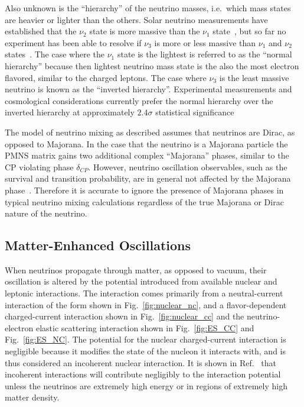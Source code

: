 Also unknown is the ``hierarchy'' of the neutrino masses, i.e.\ which
mass states are heavier or lighter than the others.
Solar neutrino measurements have established that the $\nu_{2}$ state
is more massive than the $\nu_{1}$ state~\citep{sno_first, sno_combined}, but so far no experiment has been
able to resolve if $\nu_{3}$ is more or less massive than $\nu_{1}$ and $\nu_{2}$ states~\citep{vogel_hierarchy}.
The case where the $\nu_{1}$ state is the lightest is referred to as the
``normal hierarchy'' because then lightest neutrino mass state 
is the also the most electron flavored, similar to the charged leptons.
The case where $\nu_{3}$ is the least massive neutrino is known as the
``inverted hierarchy''.
 Experimental measurements and cosmological considerations currently prefer
 the normal hierarchy over the inverted hierarchy at approximately $2.4\sigma$ statistical
 significance~\citep{nu_fit}

The model of neutrino mixing as described assumes that neutrinos are Dirac, as opposed to
Majorana. In the case that the neutrino is a Majorana particle the PMNS matrix
gains two additional complex ``Majorana'' phases, similar to the CP violating
phase $\delta_{CP}$.
However, neutrino oscillation observables, such as the survival and transition
probability, are in general not affected by the Majorana phase~\citep{majorana_mixing}.
Therefore it is accurate to ignore the presence of Majorana phases in typical 
neutrino mixing calculations regardless of the true Majorana or Dirac nature of the neutrino.

\subsection{Matter-Enhanced Oscillations}
When neutrinos propagate through matter, as opposed to vacuum, their oscillation is altered
by the potential introduced from available nuclear and leptonic interactions.
The interaction comes primarily from a neutral-current interaction of the form
shown in Fig.~\ref{fig:nuclear_nc}, and a flavor-dependent charged-current interaction shown in
Fig.~\ref{fig:nuclear_cc} and the  neutrino-electron elastic scattering interaction shown in
Fig.~\ref{fig:ES_CC} and Fig.~\ref{fig:ES_NC}.
The potential for the nuclear charged-current interaction is negligible
because it modifies the state of the nucleon it interacts with,
and is thus considered an incoherent nuclear interaction.
It is shown in Ref.~\citep{wolfenstein_osc} that incoherent interactions
will contribute negligibly to the interaction potential unless the neutrinos
are extremely high energy or in regions of extremely high matter density.

